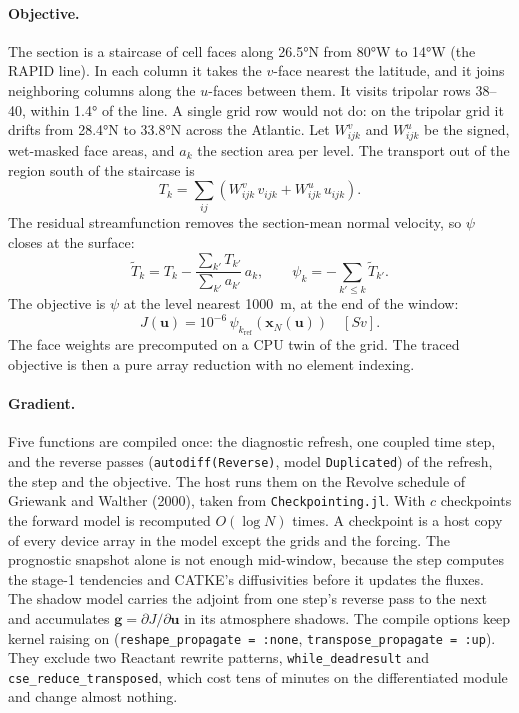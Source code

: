 \documentclass[11pt]{article}
\newcommand{\uu}{\mathbf{u}}
\newcommand{\xx}{\mathbf{x}}
\newcommand{\gvec}{\mathbf{g}}
\begin{document}
\paragraph{Objective.} The section is a staircase of cell faces along \ang{26.5}N from \ang{80}W to
\ang{14}W (the RAPID line). In each column it takes the $v$-face nearest the latitude, and it joins
neighboring columns along the $u$-faces between them. It visits tripolar rows 38--40, within
\ang{1.4} of the line. A single grid row would not do: on the tripolar grid it drifts from
\ang{28.4}N to \ang{33.8}N across the Atlantic. Let $W^{v}_{ijk}$ and $W^{u}_{ijk}$ be the signed,
wet-masked face areas, and $a_k$ the section area per level. The transport out of the region south of
the staircase is
\begin{equation}
T_k = \sum_{ij} \left( W^{v}_{ijk}\, v_{ijk} + W^{u}_{ijk}\, u_{ijk} \right).
\end{equation}
The residual streamfunction removes the section-mean normal velocity, so $\psi$ closes at the surface:
\begin{equation}
\tilde T_k = T_k - \frac{\sum_{k'} T_{k'}}{\sum_{k'} a_{k'}}\, a_k, \qquad
\psi_k = -\sum_{k' \le k} \tilde T_{k'} .
\end{equation}
The objective is $\psi$ at the level nearest \SI{1000}{m}, at the end of the window:
\begin{equation}
J(\uu) = 10^{-6}\, \psi_{k_{\text{ref}}}\!\left(\xx_N(\uu)\right) \quad [\si{Sv}].
\label{eq:obj}
\end{equation}
The face weights are precomputed on a CPU twin of the grid. The traced objective is then a pure array
reduction with no element indexing.

\paragraph{Gradient.} Five functions are compiled once: the diagnostic refresh, one coupled time step,
and the reverse passes (\texttt{autodiff(Reverse)}, model \texttt{Duplicated}) of the refresh, the step
and the objective. The host runs them on the Revolve schedule of Griewank and Walther (2000), taken
from \texttt{Checkpointing.jl}. With $c$ checkpoints the forward model is recomputed
$O(\log N)$ times. A checkpoint is a host copy of every device array in the model except the grids and
the forcing. The prognostic snapshot alone is not enough mid-window, because the step computes the
stage-1 tendencies and CATKE's diffusivities before it updates the fluxes. The shadow model carries the
adjoint from one step's reverse pass to the next and accumulates $\gvec = \partial J/\partial \uu$ in
its atmosphere shadows. The compile options keep kernel raising on (\texttt{reshape\_propagate = :none},
\texttt{transpose\_propagate = :up}). They exclude two Reactant rewrite patterns,
\texttt{while\_deadresult} and \texttt{cse\_reduce\_transposed}, which cost tens of minutes on the
differentiated module and change almost nothing.
\end{document}
